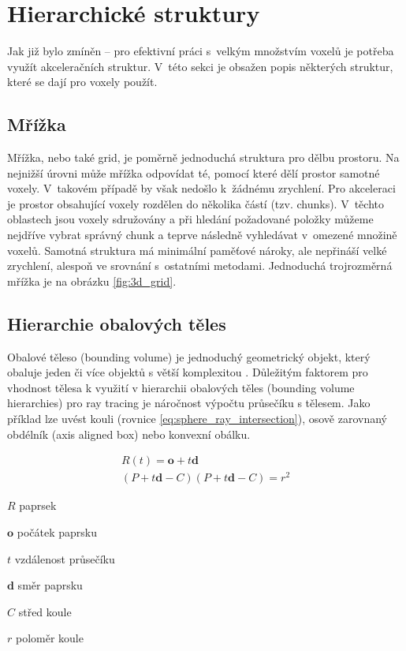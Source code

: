 \section{Hierarchické struktury}
Jak již bylo zmíněn – pro efektivní práci s~velkým množstvím voxelů je potřeba využít akceleračních struktur. V~této sekci je obsažen popis některých struktur, které se dají pro voxely použít.

\subsection{Mřížka}
Mřížka, nebo také grid, je poměrně jednoduchá struktura pro dělbu prostoru. Na nejnižší úrovni může mřížka odpovídat té, pomocí které dělí prostor samotné voxely. V~takovém případě by však nedošlo k~žádnému zrychlení. Pro akceleraci je prostor obsahující voxely rozdělen do několika částí (tzv. chunks). V~těchto oblastech jsou voxely sdružovány a při hledání požadované položky můžeme nejdříve vybrat správný chunk a teprve následně vyhledávat v~omezené množině voxelů. Samotná struktura má minimální paměťové nároky, ale nepřináší velké zrychlení, alespoň ve srovnání s~ostatními metodami. Jednoduchá trojrozměrná mřížka je na obrázku \ref{fig:3d_grid}.

\subsection{Hierarchie obalových těles} \label{sec:BVH}
Obalové těleso (bounding volume) je jednoduchý geometrický objekt, který obaluje jeden či více objektů s větší komplexitou \cite{ericson_2005}. Důležitým faktorem pro vhodnost tělesa k využití v hierarchii obalových těles (bounding volume hierarchies) pro ray tracing je náročnost výpočtu průsečíku s tělesem. Jako příklad lze uvést kouli (rovnice \ref{eq:sphere_ray_intersection}), osově zarovnaný obdélník (axis aligned box) nebo konvexní obálku. 

\begin{equation} \label{eq:sphere_ray_intersection}
	\begin{gathered}
	    R(t) = \textbf{o} + t\textbf{d}  \\
	    
	    (P + t\textbf{d} - C) (P + t\textbf{d} - C) = r^2
	    
	\end{gathered}
\end{equation}

\begin{eqexpl}[60mm]
\item{$R$} paprsek
\item{$\textbf{o}$} počátek paprsku
\item{$t$} vzdálenost průsečíku
\item{$\textbf{d}$} směr paprsku
\item{$C$} střed koule
\item{$r$} poloměr koule
\end{eqexpl}


